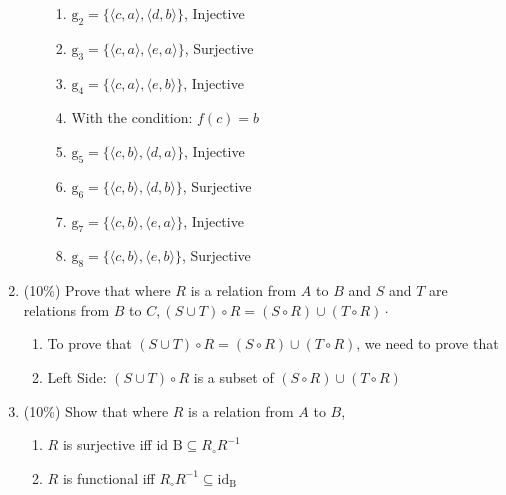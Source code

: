 \documentclass[10pt]{article}
\begin{document}
\begin{enumerate}
\begin{enumerate}
\begin{enumerate}
      \item $\mathrm{g}_{2}=\{\langle c, a\rangle, \langle d, b\rangle\}$, Injective
      \item $\mathrm{g}_{3}=\{\langle c, a\rangle, \langle e, a\rangle\}$, Surjective
      \item $\mathrm{g}_{4}=\{\langle c, a\rangle, \langle e, b\rangle\}$, Injective
      \item With the condition: $f(c)=b$
      \item $\mathrm{g}_{5}=\{\langle c, b\rangle, \langle d, a\rangle\}$, Injective
      \item $\mathrm{g}_{6}=\{\langle c, b\rangle, \langle d, b\rangle\}$, Surjective
      \item $\mathrm{g}_{7}=\{\langle c, b\rangle, \langle e, a\rangle\}$, Injective
      \item $\mathrm{g}_{8}=\{\langle c, b\rangle, \langle e, b\rangle\}$, Surjective

    \end{enumerate}
  \end{enumerate}
  \item (10\%) Prove that where $R$ is a relation from $A$ to $B$ and $S$ and $T$ are relations from $B$ to $C,(S \cup T) \circ R=(S \circ R) \cup(T \circ R) \cdot$
  \begin{enumerate}
    \item To prove that $(S \cup T) \circ R=(S \circ R) \cup(T \circ R)$, we need to prove that 
    \item Left Side: $(S \cup T) \circ R$ is a subset of $(S \circ R) \cup(T \circ R)$
  \end{enumerate}

  \item (10\%) Show that where $R$ is a relation from $A$ to $B$,
  \begin{enumerate}
    \item $R$ is surjective iff id $\mathrm{B} \subseteq R_{\circ} R^{-1}$

    \item $R$ is functional iff $R_{\circ} R^{-1} \subseteq \mathrm{id}_{\mathrm{B}}$
  \end{enumerate}
\end{enumerate}
\end{document}
